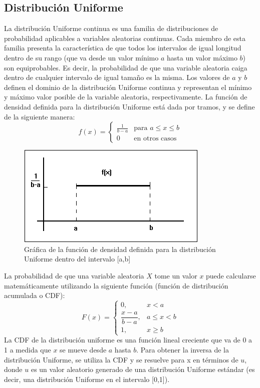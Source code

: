 \documentclass{article}
\begin{document}
\subsection{Distribución Uniforme}
 La distribución Uniforme continua es una familia de distribuciones de probabilidad aplicables a variables aleatorias continuas. Cada miembro de esta familia presenta la característica de que todos los intervalos de igual longitud dentro de su rango (que va desde un valor mínimo $a$ hasta un valor máximo $b$) son equiprobables. Es decir, la probabilidad de que una variable aleatoria caiga dentro de cualquier intervalo de igual tamaño es la misma. Los valores de $a$ y $b$ definen el dominio de la distribución Uniforme continua y representan el mínimo y máximo valor posible de la variable
 aleatoria, respectivamente.
 La función de densidad definida para la distribución Uniforme está dada por tramos, y se define de la siguiente manera:
    \begin{equation}
        f(x) = \begin{cases}
        \frac{1}{b-a} & \text{para } a \leq x \leq b \\
        0 & \text{en otros casos}
    \end{cases}
    \end{equation}
\begin{figure}[H]
    \centering
    \includegraphics[width=0.5\linewidth]{Imagenes/Distr.Uniforme.png}
    \caption{ Gráfica de la función de densidad definida para la distribución Uniforme dentro del intervalo [a,b]}
    \label{fig:Distr.Uniforme}
\end{figure}
La probabilidad de que una variable aleatoria $X$ tome un valor $x$ puede calcularse matemáticamente utilizando la siguiente función (función de distribución acumulada o CDF):
\begin{equation}
    F(x) = 
    \begin{cases}
    0, & x < a \\
    \dfrac{x - a}{b - a}, & a \leq x < b \\
    1, & x \geq b
    \end{cases}
\end{equation}
La CDF de la distribución uniforme es una función lineal creciente que va de 0 a 1 a medida que $x$ se mueve desde $a$ hasta $b$. Para obtener la inversa de la distribución Uniforme, se utiliza la CDF y se resuelve para x en términos de $u$, donde $u$ es un valor aleatorio generado de una distribución Uniforme estándar (es decir, una distribución Uniforme en el intervalo [0,1]).
\end{document}
